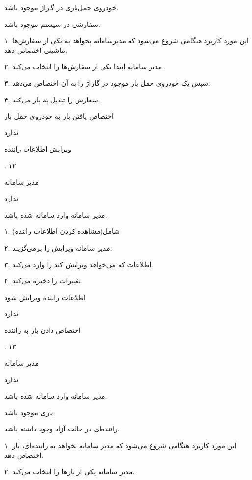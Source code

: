 خودروی حمل‌باری در گاراژ موجود باشد.

سفارشی در سیستم موجود باشد.


۱. این مورد کاربرد هنگامی شروع می‌شود که مدیرسامانه بخواهد به یکی از سفارش‌ها ماشینی اختصاص دهد.

۲. مدیر سامانه ابتدا یکی از سفارش‌ها را انتخاب می‌کند.

۳. سپس یک خودروی حمل بار موجود در گاراژ را به آن اختصاص می‌دهد.

۴. سفارش را تبدیل به بار می‌کند.

اختصاص یافتن بار به خودروی حمل بار

ندارد

\newpage

ویرایش اطلاعات راننده

.
۱۲

مدیر سامانه

ندارد

مدیر سامانه وارد سامانه شده باشد.


۱. شامل(مشاهده کردن اطلاعات راننده)

۲. مدیر سامانه ویرایش را برمی‌گزیند.

۳. اطلاعات که می‌خواهد ویرایش کند را وارد می‌کند.

۴. تغییرات را ذخیره می‌کند.

اطلاعات راننده ویرایش شود

ندارد

\newpage

اختصاص دادن بار به راننده

.
۱۳

مدیر سامانه

ندارد


مدیر سامانه وارد سامانه شده باشد.

باری موجود باشد.

راننده‌ای در حالت آزاد وجود داشته باشد.


۱. این مورد کاربرد هنگامی شروع می‌شود که مدیر سامانه بخواهد به راننده‌ای، بار اختصاص دهد.

۲. مدیر سامانه یکی از بارها را انتخاب می‌کند.

